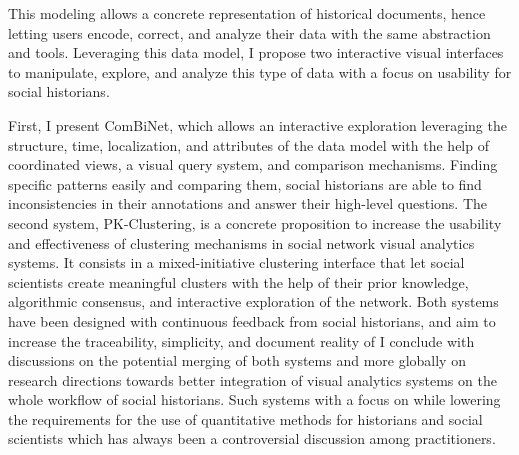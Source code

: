{%
    This modeling allows a concrete representation of historical documents, hence letting users encode, correct, and analyze their data with the same abstraction and tools.
    Leveraging this data model, I propose two interactive visual interfaces to manipulate, explore, and analyze this type of data with a focus on usability for social historians.

    First, I present ComBiNet, which allows an interactive exploration leveraging the structure, time, localization, and attributes of the data model with the help of coordinated views, a visual query system, and comparison mechanisms.
    Finding specific patterns easily and comparing them, social historians are able to find inconsistencies in their annotations and answer their high-level questions.
    The second system, PK-Clustering, is a concrete proposition to increase the usability and effectiveness of clustering mechanisms in social network visual analytics systems. It consists in a mixed-initiative clustering interface that let social scientists create meaningful clusters with the help of their prior knowledge, algorithmic consensus, and interactive exploration of the network.
    Both systems have been designed with continuous feedback from social historians, and aim to increase the traceability, simplicity, and document reality of
    I conclude with discussions on the potential merging of both systems and more globally on research directions towards better integration of visual analytics systems on the whole workflow of social historians.
    Such systems with a focus on  while lowering the requirements for the use of quantitative methods for historians and social scientists which has always been a controversial discussion among practitioners.
}

